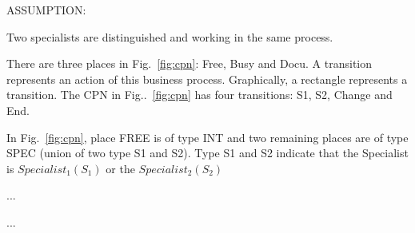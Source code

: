\documentclass[a4paper]{article}
\begin{document}
ASSUMPTION:\par
Two specialists are distinguished and working in the same process.\par
There are three places in Fig.~\ref{fig:cpn}: Free, Busy and Docu. A transition represents an action of this business process. Graphically, a rectangle
represents a transition. The CPN in Fig..~\ref{fig:cpn} has four transitions: S1, S2, Change and End.\par
In Fig.~\ref{fig:cpn}, place FREE is of type INT and two remaining places are of type SPEC (union of two type S1 and S2). Type S1 and S2 indicate that the Specialist
is $Specialist_1(S_1)$ or the $Specialist_2(S_2)$


\newpage
\begin{thebibliography}{80}


	...


	...


\end{thebibliography}
\end{document}
